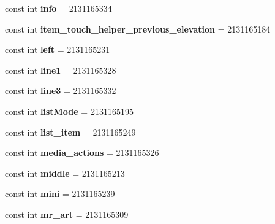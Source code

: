 \begin{DoxyCompactItemize}
const int {\bfseries info} = 2131165334
\item 
\mbox{\label{classXaria_1_1Resource_1_1Id_abda0a6121880cf28620d70e51832c879}} 
const int {\bfseries item\+\_\+touch\+\_\+helper\+\_\+previous\+\_\+elevation} = 2131165184
\item 
\mbox{\label{classXaria_1_1Resource_1_1Id_a4c92aec26b04b7be4919577b52f7ad5c}} 
const int {\bfseries left} = 2131165231
\item 
\mbox{\label{classXaria_1_1Resource_1_1Id_a35dad7609a21cf4eef52ded721662924}} 
const int {\bfseries line1} = 2131165328
\item 
\mbox{\label{classXaria_1_1Resource_1_1Id_a64470a5a176eb7c40b3f34395e4f7771}} 
const int {\bfseries line3} = 2131165332
\item 
\mbox{\label{classXaria_1_1Resource_1_1Id_a869656136ea0afdef619cc078f3dc276}} 
const int {\bfseries list\+Mode} = 2131165195
\item 
\mbox{\label{classXaria_1_1Resource_1_1Id_a8b8344649bcee2265dda7655dce0c68d}} 
const int {\bfseries list\+\_\+item} = 2131165249
\item 
\mbox{\label{classXaria_1_1Resource_1_1Id_a0f81900750673311f04aea162c30f056}} 
const int {\bfseries media\+\_\+actions} = 2131165326
\item 
\mbox{\label{classXaria_1_1Resource_1_1Id_a6c435aed0408d195b2ff62c152ed6ac2}} 
const int {\bfseries middle} = 2131165213
\item 
\mbox{\label{classXaria_1_1Resource_1_1Id_adc2a7a58e84a1b9042939e3d60964da0}} 
const int {\bfseries mini} = 2131165239
\item 
\mbox{\label{classXaria_1_1Resource_1_1Id_abe57aed8be27521c9ab1f9a100fffab3}} 
const int {\bfseries mr\+\_\+art} = 2131165309
\item 

\end{DoxyCompactItemize}
